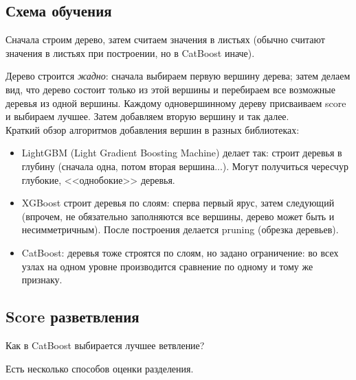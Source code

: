 \documentclass[a4paper,12pt]{article}
\begin{document}
\subsection{Схема обучения}

Сначала строим дерево, затем считаем значения в листьях (обычно считают значения в листьях при построении, но в CatBoost иначе).

Дерево строится \textit{жадно}: сначала выбираем первую вершину дерева; затем делаем вид, что дерево состоит только из этой вершины и перебираем все возможные деревья из одной вершины.
Каждому одновершинному дереву присваиваем score и выбираем лучшее.
Затем добавляем вторую вершину и так далее.  \\

Краткий обзор алгоритмов добавления вершин в разных библиотеках:
\begin{itemize}[noitemsep]
    \item LightGBM (Light Gradient Boosting Machine) делает так: строит деревья в глубину (сначала одна, потом вторая вершина...).
    Могут получиться чересчур глубокие, <<однобокие>> деревья.
    \item XGBoost строит деревья по слоям: сперва первый ярус, затем следующий (впрочем, не обязательно заполняются все вершины, дерево может быть и несимметричным).
    После построения делается pruning (обрезка деревьев).
    \item CatBoost: деревья тоже строятся по слоям, но задано ограничение: во всех узлах на одном уровне производится сравнение по одному и тому же признаку.
\end{itemize}

\subsection{Score разветвления}

Как в CatBoost выбирается лучшее ветвление?

Есть несколько способов оценки разделения.
\end{document}

